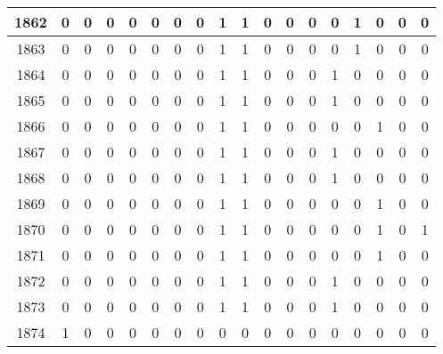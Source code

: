 \begin{tabular}{|c|c|c|c|c|c|c|c|c|c|c|c|c|c|c|c|c|c|}
\midrule
1862   &    0 &    0 &    0 &   0 &        0 &        0 &    0 &    1 &    1 &    0 &    0 &    0 &    0 &    1 &     0 &    0 &     0 \\
\midrule
1863   &    0 &    0 &    0 &   0 &        0 &        0 &    0 &    1 &    1 &    0 &    0 &    0 &    0 &    1 &     0 &    0 &     0 \\
\midrule
1864   &    0 &    0 &    0 &   0 &        0 &        0 &    0 &    1 &    1 &    0 &    0 &    0 &    1 &    0 &     0 &    0 &     0 \\
\midrule
1865   &    0 &    0 &    0 &   0 &        0 &        0 &    0 &    1 &    1 &    0 &    0 &    0 &    1 &    0 &     0 &    0 &     0 \\
\midrule
1866   &    0 &    0 &    0 &   0 &        0 &        0 &    0 &    1 &    1 &    0 &    0 &    0 &    0 &    0 &     1 &    0 &     0 \\
\midrule
1867   &    0 &    0 &    0 &   0 &        0 &        0 &    0 &    1 &    1 &    0 &    0 &    0 &    1 &    0 &     0 &    0 &     0 \\
\midrule
1868   &    0 &    0 &    0 &   0 &        0 &        0 &    0 &    1 &    1 &    0 &    0 &    0 &    1 &    0 &     0 &    0 &     0 \\
\midrule
1869   &    0 &    0 &    0 &   0 &        0 &        0 &    0 &    1 &    1 &    0 &    0 &    0 &    0 &    0 &     1 &    0 &     0 \\
\midrule
1870   &    0 &    0 &    0 &   0 &        0 &        0 &    0 &    1 &    1 &    0 &    0 &    0 &    0 &    0 &     1 &    0 &     1 \\
\midrule
1871   &    0 &    0 &    0 &   0 &        0 &        0 &    0 &    1 &    1 &    0 &    0 &    0 &    0 &    0 &     1 &    0 &     0 \\
\midrule
1872   &    0 &    0 &    0 &   0 &        0 &        0 &    0 &    1 &    1 &    0 &    0 &    0 &    1 &    0 &     0 &    0 &     0 \\
\midrule
1873   &    0 &    0 &    0 &   0 &        0 &        0 &    0 &    1 &    1 &    0 &    0 &    0 &    1 &    0 &     0 &    0 &     0 \\
\midrule
1874   &    1 &    0 &    0 &   0 &        0 &        0 &    0 &    0 &    0 &    0 &    0 &    0 &    0 &    0 &     0 &    0 &     0 \\\bottomrule\end{tabular}
